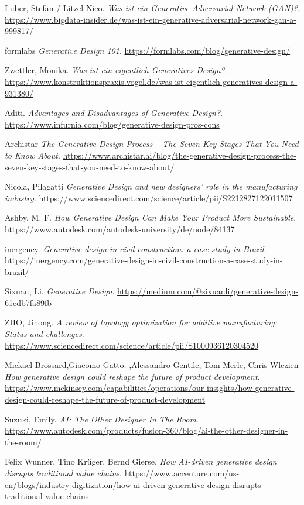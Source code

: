 \begin{thebibliography}{99}
     Luber, Stefan / Litzel Nico. \textit{Was ist ein Generative Adversarial Network (GAN)?}. \url{https://www.bigdata-insider.de/was-ist-ein-generative-adversarial-network-gan-a-999817/}

     formlabs \textit{Generative Design 101}. \url{https://formlabs.com/blog/generative-design/}

     Zwettler, Monika. \textit{Was ist ein eigentlich Generatives Design?}. \url{https://www.konstruktionspraxis.vogel.de/was-ist-eigentlich-generatives-design-a-931380/}

     Aditi. \textit{Advantages and Disadvantages of Generative Design?}. \url{https://www.infurnia.com/blog/generative-design-pros-cons}

     Archistar \textit{The Generative Design Process – The Seven Key Stages That You Need to Know About}. \url{https://www.archistar.ai/blog/the-generative-design-process-the-seven-key-stages-that-you-need-to-know-about/}

     Nicola, Pilagatti \textit{Generative Design and new designers’ role in the manufacturing industry}. \url{https://www.sciencedirect.com/science/article/pii/S2212827122011507}
    
     Ashby, M. F. \textit{How Generative Design Can Make Your Product More Sustainable}. \url{https://www.autodesk.com/autodesk-university/de/node/84137}
    
     inergency. \textit{Generative design in civil construction: a case study in Brazil}. \url{https://inergency.com/generative-design-in-civil-construction-a-case-study-in-brazil/}

     Sixuan, Li. \textit{Generative Design}. \url{    https://medium.com/@sixuanli/generative-design-61cdb7fa89fb}
    
     ZHO, Jihong. \textit{A review of topology optimization for additive manufacturing: Status and challenges}. \url{https://www.sciencedirect.com/science/article/pii/S1000936120304520}

     Mickael Brossard,Giacomo Gatto. ,Alessandro Gentile, Tom Merle, Chris Wlezien \textit{How generative design could reshape the future of product development}. \url{    https://www.mckinsey.com/capabilities/operations/our-insights/how-generative-design-could-reshape-the-future-of-product-development}

     Suzuki, Emily. \textit{AI: The Other Designer In The Room}. \url{https://www.autodesk.com/products/fusion-360/blog/ai-the-other-designer-in-the-room/}

     Felix Wunner, Tino Krüger, Bernd Gierse. \textit{How AI-driven generative design disrupts traditional value chains}. \url{https://www.accenture.com/us-en/blogs/industry-digitization/how-ai-driven-generative-design-disrupts-traditional-value-chains}
    
\end{thebibliography}